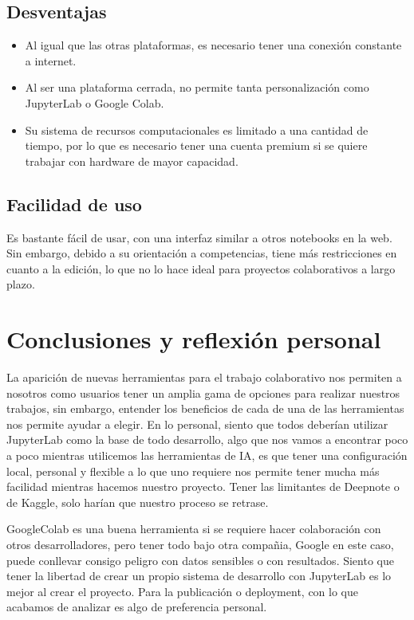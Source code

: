 \documentclass[a4paper,12pt]{article}
\begin{document}
\subsection{Desventajas}
\begin{itemize}
\item Al igual que las otras plataformas, es necesario tener una conexión constante a internet.
\item Al ser una plataforma cerrada, no permite tanta personalización como JupyterLab o Google Colab.
\item Su sistema de recursos computacionales es limitado a una cantidad de tiempo, por lo que es necesario tener una cuenta premium si se quiere trabajar con hardware de mayor capacidad.
\end{itemize}

\subsection{Facilidad de uso}
Es bastante fácil de usar, con una interfaz similar a otros notebooks en la web.
Sin embargo, debido a su orientación a competencias, tiene más restricciones en
cuanto a la edición, lo que no lo hace ideal para proyectos colaborativos a
largo plazo.

\section{Conclusiones y reflexión personal}
La aparición de nuevas herramientas para el trabajo colaborativo nos permiten a
nosotros como usuarios tener un amplia gama de opciones para realizar nuestros
trabajos, sin embargo, entender los beneficios de cada de una de las
herramientas nos permite ayudar a elegir. En lo personal, siento que todos
deberían utilizar JupyterLab como la base de todo desarrollo, algo que nos vamos
a encontrar poco a poco mientras utilicemos las herramientas de IA, es que tener
una configuración local, personal y flexible a lo que uno requiere nos permite
tener mucha más facilidad mientras hacemos nuestro proyecto. Tener las
limitantes de Deepnote o de Kaggle, solo harían que nuestro proceso se retrase.

GoogleColab es una buena herramienta si se requiere hacer colaboración con otros
desarrolladores, pero tener todo bajo otra compañia, Google en este caso, puede
conllevar consigo peligro con datos sensibles o con resultados. Siento que tener
la libertad de crear un propio sistema de desarrollo con JupyterLab es lo mejor
al crear el proyecto. Para la publicación o deployment, con lo que acabamos de
analizar es algo de preferencia personal.


\newpage


\end{document}
